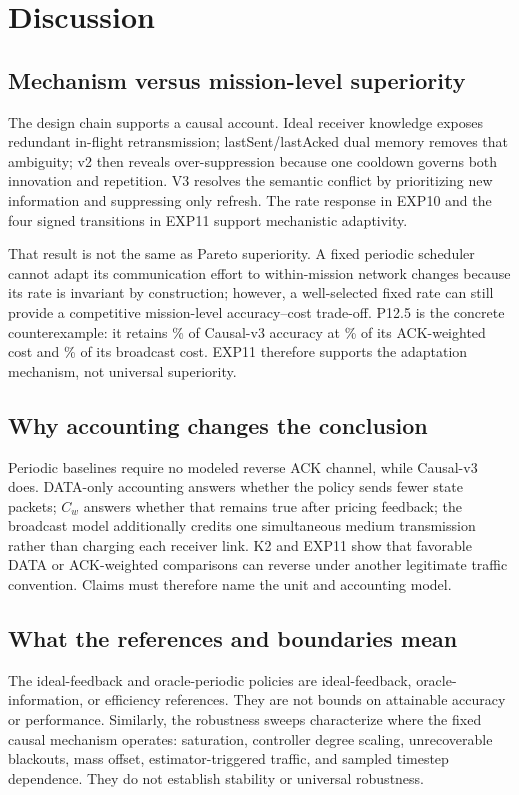 \section{Discussion}
\label{sec:discussion}

\subsection{Mechanism versus mission-level superiority}
The design chain supports a causal account. Ideal receiver knowledge exposes
redundant in-flight retransmission; lastSent/lastAcked dual memory removes that
ambiguity; v2 then reveals over-suppression because one cooldown governs both
innovation and repetition. V3 resolves the semantic conflict by prioritizing
new information and suppressing only refresh. The rate response in EXP10 and
the four signed transitions in EXP11 support mechanistic adaptivity.

That result is not the same as Pareto superiority. A fixed periodic scheduler
cannot adapt its communication effort to within-mission network changes because
its rate is invariant by construction; however, a well-selected fixed rate can
still provide a competitive mission-level accuracy--cost trade-off. P12.5 is
the concrete counterexample: it retains
\MetricElevenPonetwofiveAccuracyPercent{}\% of Causal-v3 accuracy at
\MetricElevenPonetwofiveCostPercent{}\% of its ACK-weighted cost and
\MetricElevenPonetwofiveBroadcastPercent{}\% of its broadcast cost. EXP11
therefore supports the adaptation mechanism, not universal superiority.

\subsection{Why accounting changes the conclusion}
Periodic baselines require no modeled reverse ACK channel, while Causal-v3
does. DATA-only accounting answers whether the policy sends fewer state
packets; $C_w$ answers whether that remains true after pricing feedback; the
broadcast model additionally credits one simultaneous medium transmission
rather than charging each receiver link. K2 and EXP11 show that favorable
DATA or ACK-weighted comparisons can reverse under another legitimate traffic
convention. Claims must therefore name the unit and accounting model.

\subsection{What the references and boundaries mean}
The ideal-feedback and oracle-periodic policies are ideal-feedback,
oracle-information, or efficiency references. They are not bounds on
attainable accuracy or performance. Similarly, the robustness sweeps characterize where
the fixed causal mechanism operates: saturation, controller degree scaling,
unrecoverable blackouts, mass offset, estimator-triggered traffic, and sampled
timestep dependence. They do not establish stability or universal robustness.
